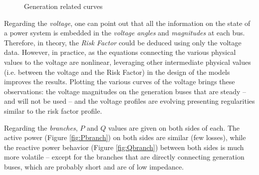 \documentclass[11pt]{article}
\def\rf{\emph{Risk Factor }}
\begin{document}
    \begin{figure}[H]
        \begin{subfigure}[t]{.27\textwidth}
            \centering
            
        \end{subfigure}\hspace{0.1\textwidth}
        \begin{subfigure}[t]{.27\textwidth}
            \centering
            
        \end{subfigure}\hspace{0.1\textwidth}
        \begin{subfigure}[t]{.27\textwidth}
            \centering
            
        \end{subfigure} 
        \caption{\label{Generation} Generation related curves}
    \end{figure}

    
    Regarding the \emph{voltage}, one can point out that all the information on the state of a power system is embedded in the \emph{voltage angles} and \emph{magnitudes} at each bus. Therefore, in theory, the \rf could be deduced using only the voltage data. However, in practice, as the equations connecting the various physical values to the voltage are nonlinear, leveraging other intermediate physical values (i.e. between the voltage and the Risk Factor) in the design of the models improves the results. Plotting the various curves of the voltage brings these observations: the voltage magnitudes on the generation buses that are steady -- and will not be used -- and the voltage profiles are evolving presenting regularities similar to the risk factor profile.

    Regarding the \emph{branches}, $P$ and $Q$ values are given on both sides of each. The active power (Figure \ref{fig:Pbranch}) on both sides are similar (few losses), while the reactive power behavior (Figure \ref{fig:Qbranch}) between both sides is much more volatile  -- except for the branches that are directly connecting generation buses, which are probably short and are of low impedance.
        
\end{document}
